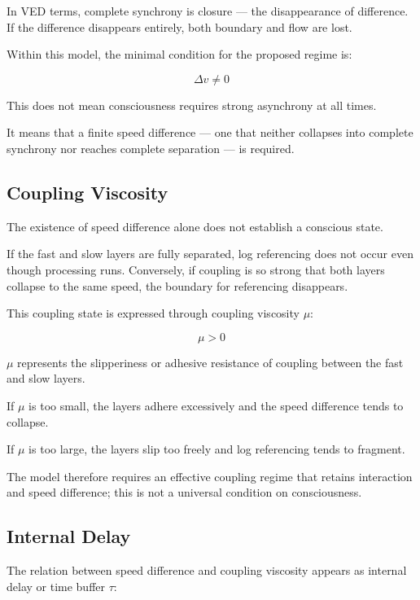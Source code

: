 In VED terms, complete synchrony is closure — the disappearance of difference. If the difference disappears entirely, both boundary and flow are lost.

Within this model, the minimal condition for the proposed regime is:

\begin{equation}
\Delta v \neq 0
\end{equation}

This does not mean consciousness requires strong asynchrony at all times.

It means that a finite speed difference — one that neither collapses into complete synchrony nor reaches complete separation — is required.

\subsection{Coupling Viscosity}


The existence of speed difference alone does not establish a conscious state.

If the fast and slow layers are fully separated, log referencing does not occur even though processing runs. Conversely, if coupling is so strong that both layers collapse to the same speed, the boundary for referencing disappears.

This coupling state is expressed through coupling viscosity $\mu$:

\begin{equation}
\mu > 0
\end{equation}

$\mu$ represents the slipperiness or adhesive resistance of coupling between the fast and slow layers.

If $\mu$ is too small, the layers adhere excessively and the speed difference tends to collapse.

If $\mu$ is too large, the layers slip too freely and log referencing tends to fragment.

The model therefore requires an effective coupling regime that retains interaction and speed difference; this is not a universal condition on consciousness.

\subsection{Internal Delay}


The relation between speed difference and coupling viscosity appears as internal delay or time buffer $\tau$:


